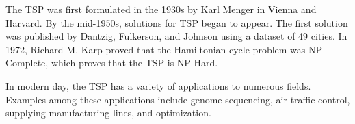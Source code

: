 \documentclass[10pt,twocolumn,letterpaper]{article}
\begin{document}
The TSP was first formulated in the 1930s by Karl Menger in Vienna and Harvard. 
By the mid-1950s, solutions for TSP began to appear. 
The first solution was published by Dantzig, Fulkerson, and Johnson using a dataset of 49 cities. 
In 1972, Richard M. Karp proved that the Hamiltonian cycle problem was NP-Complete, 
which proves that the TSP is NP-Hard.


In modern day, the TSP has a variety of applications to numerous fields. Examples among
these applications include genome sequencing, air traffic control, supplying manufacturing lines, and optimization.
\end{document}
